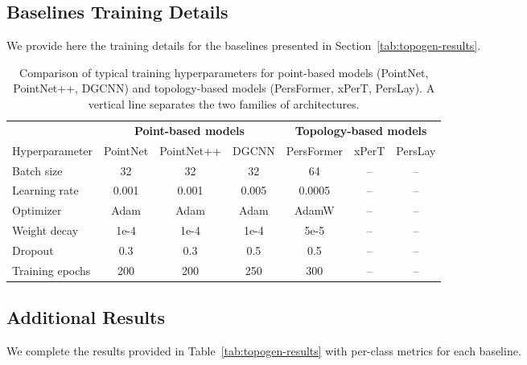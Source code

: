 \subsection{Baselines Training Details}
\label{ssec:topogen-baseline-training}

We provide here the training details for the baselines presented in Section~\ref{tab:topogen-results}.

\begin{table}[h!]
  \centering
  \begin{tabular}{l|ccc|ccc}
  \toprule
    & \multicolumn{3}{c|}{\textbf{Point-based models}} & \multicolumn{3}{c}{\textbf{Topology-based models}} \\
    Hyperparameter  & PointNet & PointNet++ & DGCNN & PersFormer & xPerT & PersLay \\
  \midrule
  Batch size              & 32    & 32    & 32    & 64    & --    & -- \\
  Learning rate           & 0.001 & 0.001 & 0.005 & 0.0005 & -- & -- \\
  Optimizer               & Adam  & Adam  & Adam  & AdamW  & --  & -- \\
  Weight decay            & 1e-4  & 1e-4  & 1e-4  & 5e-5  & --  & -- \\
  Dropout                 & 0.3   & 0.3   & 0.5   & 0.5   & --   & -- \\
  Training epochs         & 200   & 200   & 250   & 300   & --   & -- \\
  \bottomrule
  \end{tabular}
  \caption{Comparison of typical training hyperparameters for point-based models (PointNet, PointNet++, DGCNN) and topology-based models (PersFormer, xPerT, PersLay). A vertical line separates the two families of architectures.}
  \label{suppl:topogen-baseline-training}
\end{table}

\subsection{Additional Results}
\label{ssec:topogen-additional-results}

We complete the results provided in Table~\ref{tab:topogen-results} with per-class metrics for each baseline. 
